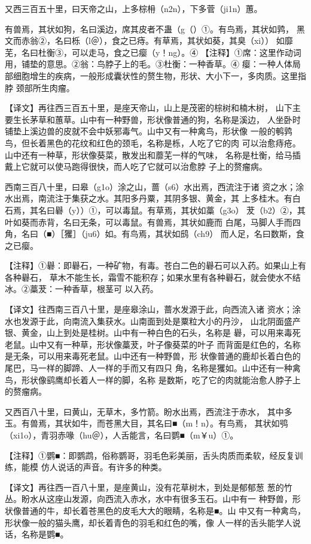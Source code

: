 \documentclass[a4paper,12pt,UTF8,twoside]{ctexbook}
\begin{document}
又西三百五十里，曰天帝之山，上多棕枏（n2n），下多菅（ji1n）蕙。

有兽焉，其状如狗，名曰溪边，席其皮者不蛊（g（）①。有鸟焉，其状如鹑， 黑文而赤翁②，名曰栎（l＠），食之已痔。有草焉，其状如葵，其臭（xi）） 如靡芜，名曰杜衡③，可以走马，食之已瘿（y！ng）。④  【注释】①席：这里作动词用，铺垫的意思。②翁：鸟脖子上的毛。③杜衡：一种香草。④ 瘿：一种人体局部细胞增生的疾病，一般形成囊状性的赘生物，形状、大小下一，多肉质。这里指脖 颈部所生肉瘤。

【译文】再往西三百五十里，是座天帝山，山上是茂密的棕树和楠木树， 山下主要生长茅草和蕙草。山中有一种野兽，形状像普通的狗，名称是溪边， 人坐卧时铺垫上溪边兽的皮就不会中妖邪毒气。山中又有一种禽鸟，形状像 一般的鹌鹑鸟，但长着黑色的花纹和红色的颈毛，名称是栎，人吃了它的肉 可以治愈痔疮。山中还有一种草，形状像葵菜，散发出和蘼芜一样的气味， 名称是杜衡，给马插戴上它就可以使马跑得很快，而人吃了它就可以治愈脖 子上的赘瘤病。

西南三百八十里，曰皋（g1o）涂之山，蔷（s6）水出焉，西流注于诸 资之水；涂水出焉，南流注于集获之水。其阳多丹粟，其阴多银、黄金，其 上多桂木。有白石焉，其名曰礜（y））①，可以毒鼠。有草焉，其状如藁（g3o） 茇（b2）②，其叶如葵而赤背，名曰无条，可以毒鼠。有兽焉，其状如鹿而 白尾，马脚人手而四角，名曰（■）［玃］（ju6）如。有鸟焉，其状如鸱（ch9） 而人足，名曰数斯，食之已瘿。

【注释】①礜：即礜石，一种矿物，有毒。苍白二色的礜石可以入药。如果山上有各种礜石， 草木不能生长，霜雪不能积存；如果水里有各种礜石，就会使水不结冰。②藁茇：一种香草，根茎可 以入药。

【译文】往西南三百八十里，是座皋涂山，蔷水发源于此，向西流入诸 资水；涂水也发源于此，向南流入集获水。山南面到处是粟粒大小的丹沙， 山北阴面盛产银、黄金，山上到处是桂树。山中有一种白色的石头，名称是 礜，可以用来毒死老鼠。山中又有一种草，形状像藁茇，叶子像葵菜的叶子 而背面是红色的，名称是无条，可以用来毒死老鼠。山中还有一种野兽，形 状像普通的鹿却长着白色的尾巴，马一样的脚蹄、人一样的手而又有四只 角，名称是玃如。山中还有一种禽鸟，形状像鹞鹰却长着人一样的脚，名称 是数斯，吃了它的肉就能治愈人脖子上的赘瘤病。

又西百八十里，曰黄山，无草木，多竹箭。盼水出焉，西流注于赤水， 其中多玉。有兽焉，其状如牛，而苍黑大目，其名曰■（m！n）。有鸟焉， 其状如鸮（xi1o），青羽赤喙（hu＠），人舌能言，名曰鹦■（m￥u）①。

【注释】①鹦■：即鹦鹉，俗称鹦哥，羽毛色彩美丽，舌头肉质而柔软，经反复训练，能模 仿人说话的声音。有许多的种类。

【译文】再往西一百八十里，是座黄山，没有花草树木，到处是郁郁葱 葱的竹丛。盼水从这座山发源，向西流入赤水，水中有很多玉石。山中有一 种野兽，形状像普通的牛，却长着苍黑色的皮毛大大的眼睛，名称是■。山 中又有一种禽鸟，形状像一般的猫头鹰，却长着青色的羽毛和红色的嘴，像 人一样的舌头能学人说话，名称是鹦■。
\end{document}
